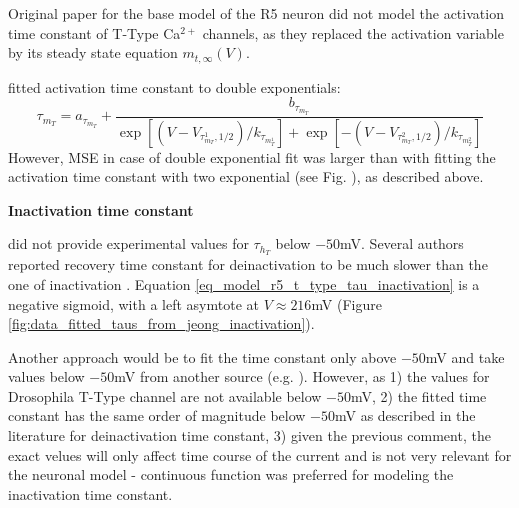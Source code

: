 \documentclass[../../workflow.tex]{subfiles}
\begin{document}
\begin{note}
    Original paper for the base model of the R5 neuron \parencite{wangMultipleDynamicalModes1994} did not
    model the activation time constant of T-Type Ca$^{2+}$ channels, as they replaced the
    activation variable by its steady state equation $m_{t,\infty}(V)$.
\end{note}

\begin{note}
    \parencite{destexheVivoVitroComputational1996} fitted activation time constant to double exponentials:
    \begin{equation}\label{eq:fitting_t_type_activation_delay_with_double_exponential}
        \tau_{m_T} = a_{\tau_{m_T}} + \frac{b_{\tau_{m_T}}}{ \exp{[(V - V_{\tau_{m_T}^1,1/2})/k_{\tau_{m_T^1}}]} + \exp{[-(V - V_{\tau_{m_T}^2,1/2})/k_{\tau_{m_T^2}}]}}
    \end{equation}
    However, MSE in case of double exponential fit was larger than with fitting the activation time constant with
    two exponential (see Fig. ), as described above.
\end{note}


\textbf{Inactivation time constant}

\parencite{jeongCaa1TFlyTtype2015} did not provide experimental values for $\tau_{h_T}$ below $-50$mV.
Several authors reported recovery time constant for deinactivation to be much slower than the one of inactivation
\parencite{huguenardNovelTtypeCurrent1992, destexheVivoVitroComputational1996, huguenardSimulationCurrentsInvolved1992}.
Equation \ref{eq_model_r5_t_type_tau_inactivation} is a negative sigmoid, with a left
asymtote at $V\approx216$mV (Figure \ref{fig:data_fitted_taus_from_jeong_inactivation}).

\begin{note}
    Another approach would be to fit the time constant only above $-50$mV and take
    values below $-50$mV from another source (e.g. \parencite{huguenardSimulationCurrentsInvolved1992}).
    However, as 1) the values for Drosophila T-Type channel are not available below $-50$mV,
    2) the fitted time constant has the same order of magnitude below $-50$mV as described
    in the literature for deinactivation time constant, 3) given the previous comment, the
    exact velues will only affect time course of the current and is not very relevant for the
    neuronal model - continuous function was preferred for modeling the inactivation time constant.
\end{note}
\end{document}
